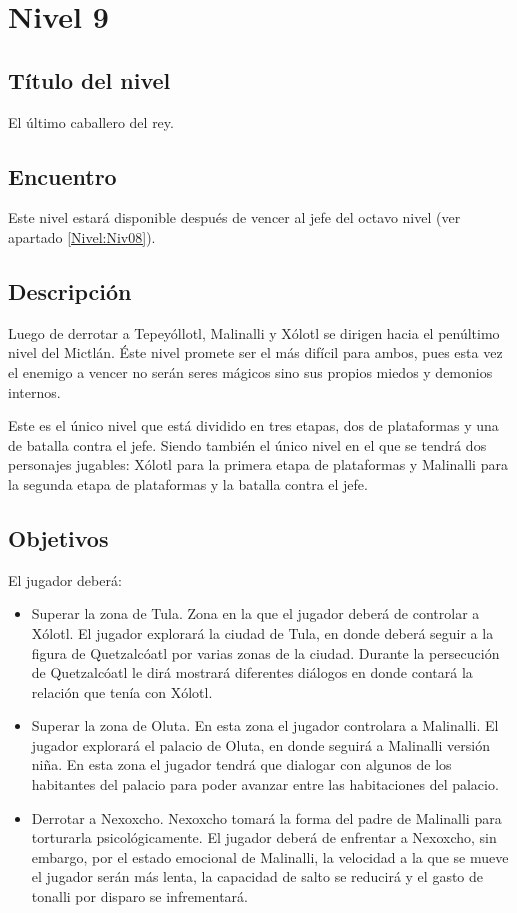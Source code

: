 	\section{Nivel 9} \label{Nivel:Niv09}
	\subsection{Título del nivel}
	El último caballero del rey.
	\subsection{Encuentro}
	Este nivel estará disponible después de vencer al jefe del octavo nivel (ver apartado \ref{Nivel:Niv08}).  
	\subsection{Descripción}
	Luego de derrotar a Tepeyóllotl, Malinalli y Xólotl se dirigen hacia el penúltimo nivel del Mictlán. Éste nivel promete ser el más difícil para ambos, pues esta vez el enemigo a vencer no serán seres mágicos sino sus propios miedos y demonios internos.
	\\
	\par
Este es el único nivel que está dividido en tres etapas, dos de plataformas y una de batalla contra el jefe. Siendo también el único nivel en el que se tendrá dos personajes jugables: Xólotl para la primera etapa de plataformas y Malinalli para la segunda etapa de plataformas y la batalla contra el jefe.

	\subsection{Objetivos}
	El jugador deberá:	
	\begin{itemize}
		\item Superar la zona de Tula. Zona en la que el jugador deberá de controlar a Xólotl. El jugador explorará la ciudad de Tula, en donde deberá seguir a la figura de Quetzalcóatl por varias zonas de la ciudad. Durante la persecución de Quetzalcóatl le dirá mostrará diferentes diálogos en donde contará la relación que tenía con Xólotl.
		\item Superar la zona de Oluta. En esta zona el jugador controlara a Malinalli. El jugador explorará el palacio de Oluta, en donde seguirá a Malinalli versión niña. En esta zona el jugador tendrá que dialogar con algunos de los  habitantes del palacio para poder avanzar entre las habitaciones del palacio.
		\item Derrotar a Nexoxcho. Nexoxcho tomará la forma del padre de Malinalli para torturarla psicológicamente.  El jugador deberá de enfrentar a Nexoxcho, sin embargo, por el estado emocional de Malinalli, la velocidad a la que se mueve el jugador serán más lenta, la capacidad de salto se reducirá y el gasto de tonalli por disparo se infrementará.
	\end{itemize}
